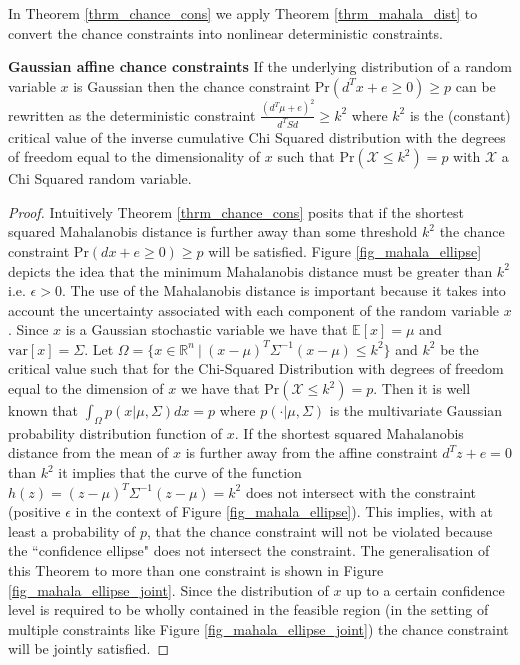 In Theorem \ref{thrm_chance_cons} we apply Theorem \ref{thrm_mahala_dist} to convert the chance constraints into nonlinear deterministic constraints.
\begin{thrm}
\textbf{Gaussian affine chance constraints} If the underlying distribution of a random variable $x$ is Gaussian then the chance constraint $\text{Pr}(d^Tx + e \geq 0) \geq p$ can be rewritten as the deterministic constraint $\frac{(d^T\mu+e)^2}{d^TSd} \geq k^2$ where $k^2$ is the (constant) critical value of the inverse cumulative Chi Squared distribution with the degrees of freedom equal to the dimensionality of $x$ such that $\text{Pr}(\mathcal{X} \leq k^2) = p$ with $\mathcal{X}$ a Chi Squared random variable. 
\label{thrm_chance_cons}
\end{thrm}
\begin{proof}
Intuitively Theorem \ref{thrm_chance_cons} posits that if the shortest squared Mahalanobis distance is further away than some threshold $k^2$ the chance constraint $\text{Pr}(dx + e \geq 0) \geq p$ will be satisfied. Figure \ref{fig_mahala_ellipse} depicts the idea that the minimum Mahalanobis distance must be greater than $k^2$ i.e. $\epsilon > 0$. The use of the Mahalanobis distance is important because it takes into account the uncertainty associated with each component of the random variable $x$. Since $x$ is a Gaussian stochastic variable we have that $\mathbb{E}[x] =\mu$ and $\text{var}[x]=\Sigma$. Let $\Omega = \{x \in \mathbb{R}^n~|~(x-\mu)^T\Sigma^{-1}(x-\mu) \leq k^2\}$ and $k^2$ be the critical value such that for the Chi-Squared Distribution with degrees of freedom equal to the dimension of $x$ we have that $\text{Pr}(\mathcal{X} \leq k^2) = p$. Then it is well known \cite{mahala2} that $\int_{\Omega}p(x|\mu, \Sigma)dx = p$ where $p(\cdot|\mu, \Sigma)$ is the multivariate Gaussian probability distribution function of $x$. If the shortest squared Mahalanobis distance from the mean of $x$ is further away from the affine constraint $d^Tz+e=0$ than $k^2$ it implies that the curve of the function $h(z) = (z-\mu)^T\Sigma^{-1}(z-\mu) = k^2$ does not intersect with the constraint (positive $\epsilon$ in the context of Figure \ref{fig_mahala_ellipse}). This implies, with at least a probability of $p$, that the chance constraint will not be violated because the ``confidence ellipse" does not intersect the constraint. The generalisation of this Theorem to more than one constraint is shown in Figure \ref{fig_mahala_ellipse_joint}.
Since the distribution of $x$ up to a certain confidence level is required to be wholly contained in the feasible region (in the setting of multiple constraints like Figure \ref{fig_mahala_ellipse_joint}) the chance constraint will be jointly satisfied.
\end{proof}
